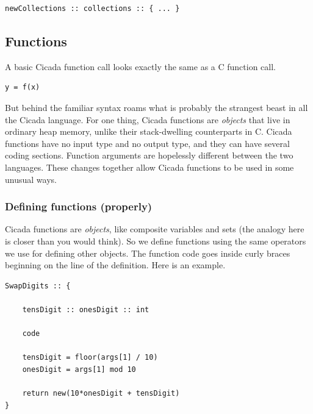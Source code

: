 \documentclass{article}
\newenvironment{code}{
       \begin{list}{}{
               \setlength{\leftmargin}{.4in}
               \setlength{\rightmargin}{0in}
               \setlength{\topsep}{.2in}
       }
       \small
       \item[] }
       { \end{list}   }
\begin{document}
\begin{code} \begin{verbatim}
newCollections :: collections :: { ... }
\end{verbatim} \end{code}










\subsection{Functions} 

A basic Cicada function call looks exactly the same as a C function call.

\begin{code} \begin{verbatim}
y = f(x)
\end{verbatim} \end{code}

\noindent But behind the familiar syntax roams what is probably the strangest beast in all the Cicada language.  For one thing, Cicada functions are \emph{objects} that live in ordinary heap memory, unlike their stack-dwelling counterparts in C.  Cicada functions have no input type and no output type, and they can have several coding sections.  Function arguments are hopelessly different between the two languages.  These changes together allow Cicada functions to be used in some unusual ways.




\subsubsection{Defining functions (properly)}

Cicada functions are \emph{objects}, like composite variables and sets (the analogy here is closer than you would think).  So we define functions using the same operators we use for defining other objects.  The function code goes inside curly braces beginning on the line of the definition.  Here is an example.

\begin{code} \begin{verbatim}
SwapDigits :: {
    
    tensDigit :: onesDigit :: int
    
    code
    
    tensDigit = floor(args[1] / 10)
    onesDigit = args[1] mod 10
    
    return new(10*onesDigit + tensDigit)
}
\end{verbatim} \end{code}
\end{document}
